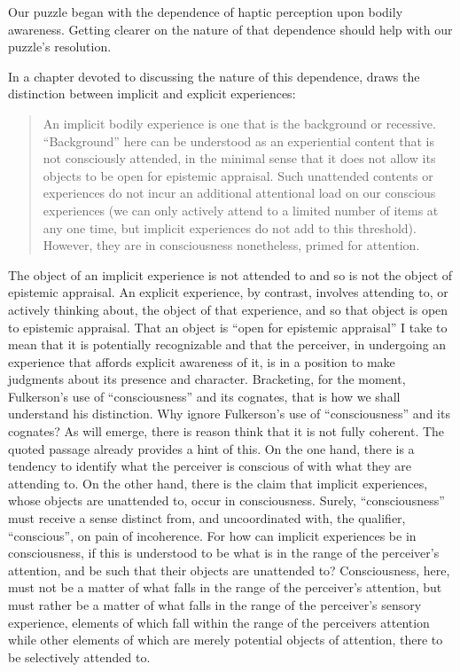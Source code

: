 Our puzzle began with the dependence of haptic perception upon bodily awareness. Getting clearer on the nature of that dependence should help with our puzzle's resolution. 

In a chapter devoted to discussing the nature of this dependence, \citet[chapter 4.6]{Fulkerson:2014ek} draws the distinction between implicit and explicit experiences:
\begin{quote}
	An implicit bodily experience is one that is the background or recessive. ``Background'' here can be understood as an experiential content that is not consciously attended, in the minimal sense that it does not allow its objects to be open for epistemic appraisal. Such unattended contents or experiences do not incur an additional attentional load on our conscious experiences (we can only actively attend to a limited number of items at any one time, but implicit experiences do not add to this threshold). However, they are in consciousness nonetheless, primed for attention. \citep[90]{Fulkerson:2014ek}
\end{quote}
The object of an implicit experience is not attended to and so is not the object of epistemic appraisal. An explicit experience, by contrast, involves attending to, or actively thinking about, the object of that experience, and so that object is open to epistemic appraisal. That an object is ``open for epistemic appraisal'' I take to mean that it is potentially recognizable and that the perceiver, in undergoing an experience that affords explicit awareness of it, is in a position to make judgments about its presence and character. Bracketing, for the moment, Fulkerson's use of ``consciousness'' and its cognates, that is how we shall understand his distinction. Why ignore Fulkerson's use of ``consciousness'' and its cognates? As will emerge, there is reason think that it is not fully coherent. The quoted passage already provides a hint of this. On the one hand, there is a tendency to identify what the perceiver is conscious of with what they are attending to. On the other hand, there is the claim that implicit experiences, whose objects are unattended to, occur in consciousness. Surely,  ``consciousness'' must receive a sense distinct from, and uncoordinated with, the qualifier, ``conscious'', on pain of incoherence. For how can implicit experiences be in consciousness, if this is understood to be what is in the range of the perceiver's attention, and be such that their objects are unattended to? Consciousness, here, must not be a matter of what falls in the range of the perceiver's attention, but must rather be a matter of what falls in the range of the perceiver's sensory experience, elements of which fall within the range of the perceivers attention while other elements of which are merely potential objects of attention, there to be selectively attended to.

